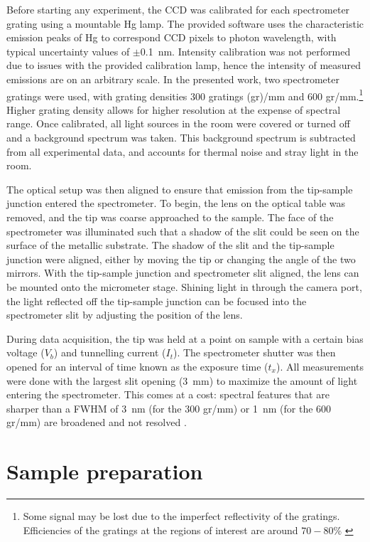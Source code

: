 Before starting any experiment, the \ac{CCD} was calibrated for each spectrometer grating using a mountable Hg lamp. The provided software uses the characteristic emission peaks of Hg to correspond \ac{CCD} pixels to photon wavelength, with typical uncertainty values of $\pm$\SI{0.1}{nm}. Intensity calibration was not performed due to issues with the provided calibration lamp, hence the intensity of measured emissions are on an arbitrary scale. In the presented work, two spectrometer gratings were used, with grating densities 300 gratings (gr)/mm and 600 gr/mm.\footnote{Some signal may be lost due to the imperfect reflectivity of the gratings. Efficiencies of the gratings at the regions of interest are around $70 - 80 \%$ \citep{princetongratings}} Higher grating density allows for higher resolution at the expense of spectral range. Once calibrated, all light sources in the room were covered or turned off and a background spectrum was taken. This background spectrum is subtracted from all experimental data, and accounts for thermal noise and stray light in the room.

The optical setup was then aligned to ensure that emission from the tip-sample junction entered the spectrometer. To begin, the lens on the optical table was removed, and the tip was coarse approached to the sample. The face of the spectrometer was illuminated such that a shadow of the slit could be seen on the surface of the metallic substrate. The shadow of the slit and the tip-sample junction were aligned, either by moving the tip or changing the angle of the two mirrors. With the tip-sample junction and spectrometer slit aligned, the lens can be mounted onto the micrometer stage. Shining light in through the camera port, the light reflected off the tip-sample junction can be focused into the spectrometer slit by adjusting the position of the lens.

During data acquisition, the tip was held at a point on sample with a certain bias voltage ($V_b$) and tunnelling current ($I_t$). The spectrometer shutter was then opened for an interval of time known as the exposure time ($t_x$). All measurements were done with the largest slit opening (\SI{3}{mm}) to maximize the amount of light entering the spectrometer. This comes at a cost: spectral features that are sharper than a \ac{FWHM} of \SI{3}{nm} (for the 300 gr/mm) or \SI{1}{nm} (for the 600 gr/mm) are broadened and not resolved \citep{princetonslit}. 



\section{Sample preparation}

